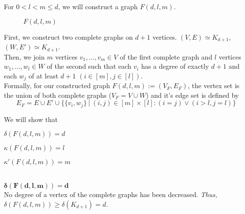 \documentclass[a4paper]{article}
\begin{document}
	\newpage
	\begin{solution}{14}
		For $0 < l < m \leq d$, we will construct a graph $F(d, l, m)$.\\

		\begin{figure}[h]
			\caption{$F(d, l, m)$}
		\end{figure}
		First, we construct two complete graphs on $d+1$ vertices. $(V, E) \simeq K_{d+1}$, $(W, E') \simeq K_{d+1}$.\\

		Then, we join $m$ vertices $v_1, ..., v_m \in V$ of the first complete graph and $l$ vertices $w_1, ..., w_l \in W$ of the second such that each $v_i$ has a degree of exactly $d+1$ and each $w_j$ of at least $d+1$ $(i \in [m], j \in [l])$.\\

		Formally, for our constructed graph $F(d, l, m) := (V_F, E_F)$,  the vertex set is the union of both complete graphs ($V_F = V \cup W$) and it's edge set is defined by
		\begin{equation}
			E_F = E \cup E' \cup \{\{v_i, w_j\}\ |\ (i, j) \in [m] \times [l]: (i = j) \lor  (i > l, j = l)\}
		\end{equation}
		
		We will show that
		\begin{compactitem}%
			\item $\delta(F(d,l,m)) = d$%
			\item $\kappa(F(d,l,m)) = l$%
			\item $\kappa'(F(d,l,m)) = m$%
		\end{compactitem}\ \\
		$\mathbf{\delta(F(d,l,m)) = d}$\\
		No degree of a vertex of the complete graphs has been decreased. \emph{Thus, $\delta(F(d,l,m)) \geq \delta(K_{d+1}) = d$.}


\end{solution}
\end{document}
